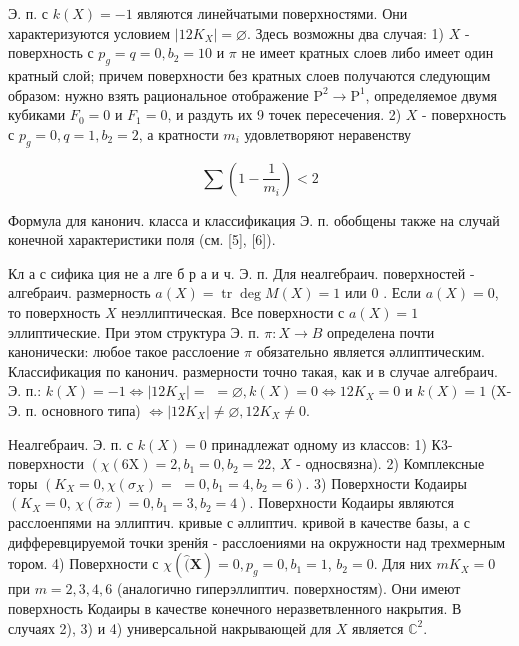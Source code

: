 \documentclass[10pt]{article}
\begin{document}
Э. п. с $k(X)=-1$ являются линейчатыми поверхностями. Они характеризуются условием $\left|12 K_{X}\right|=\varnothing$. Здесь возможны два случая: 1) $X$ - поверхность с $p_{g}=q=0, b_{2}=10$ и $\pi$ не имеет кратных слоев либо имеет один кратный слой; причем поверхности без кратных слоев получаются следующим образом: нужно взять рациональное отображение $\mathrm{P}^{2} \rightarrow \mathrm{P}^{1}$, определяемое двумя кубиками $F_{0}=0$ и $F_{1}=0$, и раздуть их 9 точек пересечения. 2) $X$ - поверхность с $p_{g}=0, q=1, b_{2}=2$, а кратности $m_{i}$ удовлетворяют неравенству



\[

\sum\left(1-\frac{1}{m_{i}}\right)<2

\]



Формула для канонич. класса и классификация Э. п. обобщены также на случай конечной характеристики поля (см. [5], [6]).



Кл а с сифика ция не а лге б р а и ч. Э. п. Для неалгебраич. поверхностей - алгебраич. размерность $a(X)=\operatorname{tr} \operatorname{deg} M(X)=1$ или 0 . Если $a(X)=0$, то поверхность $X$ неэллиптическая. Все поверхности с $a(X)=1$ эллиптические. При этом структура Э. п. $\pi: X \rightarrow B$ определена почти канонически: любое такое расслоение $\pi$ обязательно является әллиптическим. Классификация по канонич. размерности точно такая, как и в случае алгебраич. Э. п.: $k(X)=-1 \Longleftrightarrow\left|12 K_{X}\right|=$ $=\varnothing, k(X)=0 \Longleftrightarrow 12 K_{X}=0$ и $k(X)=1$ (X-Э. п. основного типа) $\Longleftrightarrow\left|12 K_{X}\right| \neq \varnothing, 12 K_{X} \neq 0$.



Неалгебраич. Э. п. с $k(X)=0$ принадлежат одному из классов: 1) К3-поверхности $\left(\chi(6 \mathrm{X})=2, b_{1}=0, b_{2}=22\right.$, $X$ - односвязна). 2) Комплексные торы $\left(K_{X}=0, \chi\left(\sigma_{X}\right)=\right.$ $\left.=0, b_{1}=4, b_{2}=6\right)$. 3) Поверхности Кодаиры $\left(K_{X}=0\right.$, $\left.\chi(\widehat{\sigma} x)=0, b_{1}=3, b_{2}=4\right)$. Поверхности Кодаиры являются расслоенпями на эллиптич. кривые с әллиптич. кривой в качестве базы, а с дифферевцируемой точки зренйя - расслоениями на окружности над трехмерным тором. 4) Поверхности с $\chi(\widehat{(} \boldsymbol{X})=0, p_{g}=0, b_{1}=1$, $b_{2}=0$. Для них $m K_{X}=0$ при $m=2,3,4,6$ (аналогично гиперэллиптич. поверхностям). Они имеют поверхность Кодаиры в качестве конечного неразветвленного накрытия. В случаях 2), 3) и 4) универсальной накрывающей для $X$ является $\mathbb{C}^{2}$.
\end{document}
